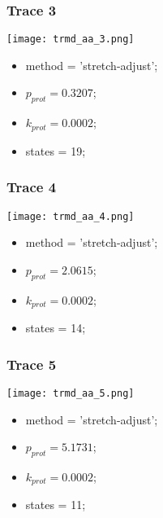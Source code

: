 \subsubsection{Trace 3}
\begin{minipage}[c]{0.7\textwidth}
    \texttt{[image: trmd\_aa\_3.png]}
\end{minipage}
\hfill
\begin{minipage}[c]{0.45\textwidth}
    \begin{itemize}
        \item method = 'stretch-adjust';
        \item $p_{prot}=0.3207$;
        \item $k_{prot}=0.0002$;
        \item states = 19;
    \end{itemize}
\end{minipage}

\subsubsection{Trace 4}
\begin{minipage}[c]{0.7\textwidth}
    \texttt{[image: trmd\_aa\_4.png]}
\end{minipage}
\hfill
\begin{minipage}[c]{0.45\textwidth}
    \begin{itemize}
        \item method = 'stretch-adjust';
        \item $p_{prot}=2.0615$;
        \item $k_{prot}=0.0002$;
        \item states = 14;
    \end{itemize}
\end{minipage}

\subsubsection{Trace 5}
\begin{minipage}[c]{0.7\textwidth}
    \texttt{[image: trmd\_aa\_5.png]}
\end{minipage}
\hfill
\begin{minipage}[c]{0.45\textwidth}
    \begin{itemize}
        \item method = 'stretch-adjust';
        \item $p_{prot}=5.1731$;
        \item $k_{prot}=0.0002$;
        \item states = 11;
    \end{itemize}
\end{minipage}

